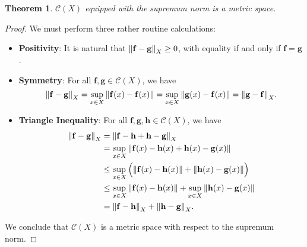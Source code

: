 \documentclass[11pt]{article}
\newtheorem{theorem}{Theorem}
\renewcommand{\vec}[1]{\mathbf{#1}}
\begin{document}
\begin{theorem}
	$\mathcal{C}(X)$ equipped with the supremum norm is a metric space.
\end{theorem}
\begin{adjustwidth}{1cm}{}
	\begin{proof}
		We must perform three rather routine calculations:
		\begin{itemize}
			\item \textbf{Positivity}: It is natural that $\norm{\vec{f} - \vec{g}}_{X} \ge 0$, with equality if and only if $\vec{f} = \vec{g}$.
			\item \textbf{Symmetry}: For all $\vec{f}, \vec{g} \in \mathcal{C}(X)$, we have
			\[
				\norm{\vec{f} - \vec{g}}_{X} = \sup\limits_{x \in X} \norm{\vec{f}(x) - \vec{f}(x)} = \sup\limits_{x \in X} \norm{\vec{g}(x) - \vec{f}(x)} = \norm{\vec{g} - \vec{f}}_{X}.
			\]
			\item \textbf{Triangle Inequality}: For all $\vec{f}, \vec{g}, \vec{h} \in \mathcal{C}(X)$, we have
			\begin{align*}
				\norm{\vec{f} - \vec{g}}_{X} &= \norm{\vec{f} - \vec{h} + \vec{h} - \vec{g}}_{X} \\
				&= \sup\limits_{x \in X} \norm{\vec{f}(x) - \vec{h}(x) + \vec{h}(x) - \vec{g}(x)} \\
				&\le \sup\limits_{x \in X} \Big( \norm{\vec{f}(x) - \vec{h}(x)} + \norm{\vec{h}(x) - \vec{g}(x)} \Big) \\
				&\le \sup\limits_{x \in X} \norm{\vec{f}(x) - \vec{h}(x)} + \sup\limits_{x \in X} \norm{\vec{h}(x) - \vec{g}(x)} \\
				&= \norm{\vec{f} - \vec{h}}_{X} + \norm{\vec{h} - \vec{g}}_{X}.
			\end{align*}
		\end{itemize}
		We conclude that $\mathcal{C}(X)$ is a metric space with respect to the supremum norm.
	\end{proof}
\end{adjustwidth}
\end{document}
